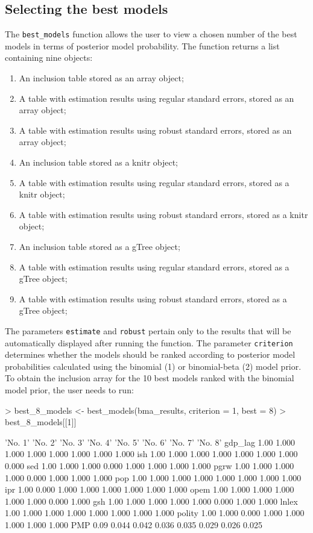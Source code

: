 \documentclass[a4paper]{article}
\begin{document}
\subsection{Selecting the best models}
The \verb+best_models+ function allows the user to view a chosen number of the best models in terms of posterior model probability.
The function returns a list containing nine objects:
\begin{enumerate}
    \item An inclusion table stored as an array object;
    \item A table with estimation results using regular standard errors, stored as an array object;
    \item A table with estimation results using robust standard errors, stored as an array object;
    \item An inclusion table stored as a knitr object;
    \item A table with estimation results using regular standard errors, stored as a knitr object;
    \item A table with estimation results using robust standard errors, stored as a knitr object;
    \item An inclusion table stored as a gTree object;
    \item A table with estimation results using regular standard errors, stored as a gTree object;
    \item A table with estimation results using robust standard errors, stored as a gTree object;
\end{enumerate}
The parameters \verb+estimate+ and \verb+robust+ pertain only to the results that will be automatically displayed after running the function.
The parameter \verb+criterion+ determines whether the models should be ranked according to posterior model probabilities calculated using the binomial (1) or binomial-beta (2) model prior.
To obtain the inclusion array for the 10 best models ranked with the binomial model prior, the user needs to run:
\begin{Schunk}
\begin{Sinput}
> best_8_models <- best_models(bma_results, criterion = 1, best = 8)
> best_8_models[[1]]
\end{Sinput}
\begin{Soutput}
        'No. 1' 'No. 2' 'No. 3' 'No. 4' 'No. 5' 'No. 6' 'No. 7' 'No. 8'
gdp_lag    1.00   1.000   1.000   1.000   1.000   1.000   1.000   1.000
ish        1.00   1.000   1.000   1.000   1.000   1.000   1.000   0.000
sed        1.00   1.000   1.000   0.000   1.000   1.000   1.000   1.000
pgrw       1.00   1.000   1.000   1.000   0.000   1.000   1.000   1.000
pop        1.00   1.000   1.000   1.000   1.000   1.000   1.000   1.000
ipr        1.00   0.000   1.000   1.000   1.000   1.000   1.000   1.000
opem       1.00   1.000   1.000   1.000   1.000   1.000   0.000   1.000
gsh        1.00   1.000   1.000   1.000   1.000   0.000   1.000   1.000
lnlex      1.00   1.000   1.000   1.000   1.000   1.000   1.000   1.000
polity     1.00   1.000   0.000   1.000   1.000   1.000   1.000   1.000
PMP        0.09   0.044   0.042   0.036   0.035   0.029   0.026   0.025
\end{Soutput}
\end{Schunk}
\end{document}
